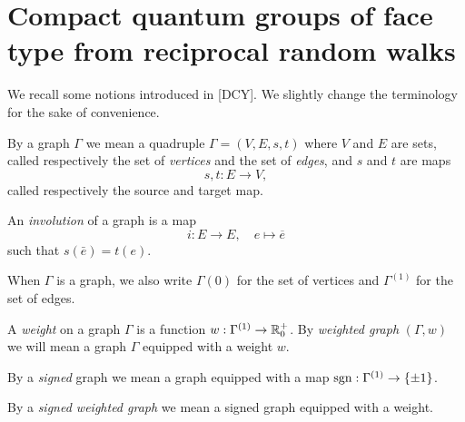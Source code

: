 



\section{Compact quantum groups of face type from reciprocal random walks} 


We recall some notions introduced in [DCY]. We slightly change the terminology for the sake of convenience.

\begin{Def} By a graph $\Gamma$ we mean a quadruple $\Gamma=(V,E,s,t)$ where $V$ and $E$ are sets, called respectively the set of \emph{vertices} and the set of \emph{edges}, and $s$ and $t$ are maps \[s,t:E\rightarrow V,\] called respectively the source and target map.

An \emph{involution} of a graph is a map \[i:E \rightarrow E,\quad e\mapsto \overline{e}\] such that $s(\bar{e}) = t(e)$. 
\end{Def}

When $\Gamma$ is a graph, we also write $\Gamma{(0)}$ for the set of vertices and $\Gamma^{(1)}$ for the set of edges.


\begin{Def} A \emph{weight} on a graph $\Gamma$ is a function $w:\Gamma^{(1)}\rightarrow \mathbb{R}_0^+$. By \emph{weighted graph} $(\Gamma,w)$ we will mean a graph $\Gamma$ equipped with a weight $w$. 

By a \emph{signed} graph we mean a graph equipped with a map $\operatorname{\mathrm{sgn}}:\Gamma^{(1)}\rightarrow \{\pm 1\}$. 

By a \emph{signed weighted graph} we mean a signed graph equipped with a weight.
\end{Def}

